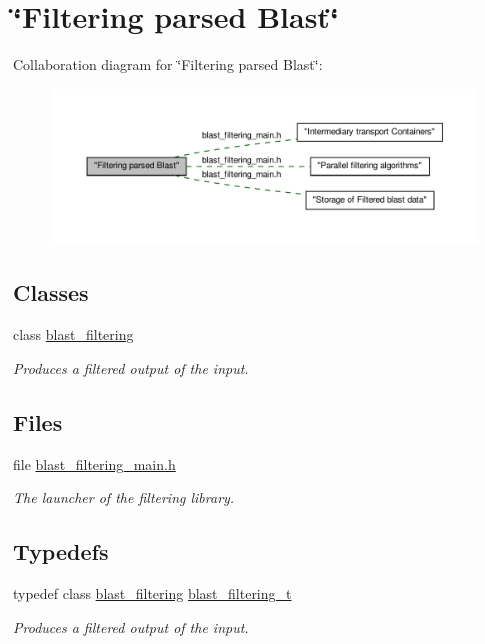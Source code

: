 \hypertarget{group__filtering}{
\section{\char`\"{}Filtering parsed Blast\char`\"{}}
\label{group__filtering}
}
Collaboration diagram for \char`\"{}Filtering parsed Blast\char`\"{}:\nopagebreak
\begin{figure}[H]
\begin{center}
\leavevmode
\includegraphics[width=400pt]{group__filtering}
\end{center}
\end{figure}
\subsection*{Classes}
\begin{DoxyCompactItemize}
\item 
class \hyperlink{classblast__filtering}{blast\_\-filtering}
\begin{DoxyCompactList}\small\item\em Produces a filtered output of the input. \end{DoxyCompactList}\end{DoxyCompactItemize}
\subsection*{Files}
\begin{DoxyCompactItemize}
\item 
file \hyperlink{blast__filtering__main_8h}{blast\_\-filtering\_\-main.h}


\begin{DoxyCompactList}\small\item\em The launcher of the filtering library. \end{DoxyCompactList}

\end{DoxyCompactItemize}
\subsection*{Typedefs}
\begin{DoxyCompactItemize}
\item 
typedef class \hyperlink{classblast__filtering}{blast\_\-filtering} \hyperlink{group__filtering_ga4e46d6c13066b35a9b35ab26ca66e3d4}{blast\_\-filtering\_\-t}
\begin{DoxyCompactList}\small\item\em Produces a filtered output of the input. \end{DoxyCompactList}\end{DoxyCompactItemize}


